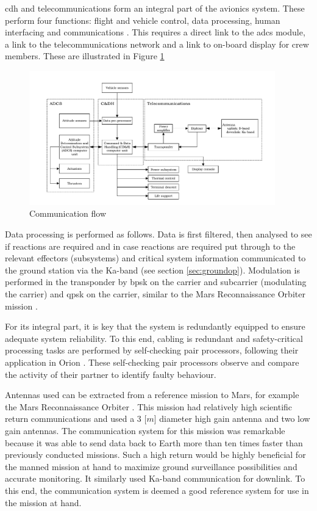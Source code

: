 \acrfull{cdh} and telecommunications form an integral part of the avionics system. These perform four functions: flight and vehicle control, data processing, human interfacing and communications \cite{Eger2008}. This requires a direct link to the \gls{adcs} module, a link to the telecommunications network and a link to on-board display for crew members. These are illustrated in Figure \ref{fig:cdhflow}

\begin{figure}[ht]
		\centering
		\includegraphics[width=0.95\textwidth]{./Figure/CrewModule/CDH.pdf}
		\caption{Communication flow}
		\label{fig:cdhflow}
\end{figure}

Data processing is performed as follows. Data is first filtered, then analysed to see if reactions are required and in case reactions are required put through to the relevant effectors (subsystems) and critical system information communicated to the ground station via the Ka-band (see section \ref{sec:groundop}). Modulation is performed in the transponder by \gls{bpsk} on the carrier and subcarrier (modulating the carrier) and \gls{qpsk} on the carrier, similar to the Mars Reconnaissance Orbiter mission \cite{Taylor2006}.

For its integral part, it is key that the system is redundantly equipped to ensure adequate system reliability. To this end, cabling is redundant and safety-critical processing tasks are performed by self-checking pair processors, following their application in Orion \cite{Eger2008}. These self-checking pair processors observe and compare the activity of their partner to identify faulty behaviour. 

Antennas used can be extracted from a reference mission to Mars, for example the Mars Reconnaissance Orbiter \cite{Taylor2006}. This mission had relatively high scientific return communications and used a $3$ [$m$] diameter high gain antenna and two low gain antennas. The communication system for this mission was remarkable because it was able to send data back to Earth more than ten times faster than previously conducted missions. Such a high return would be highly beneficial for the manned mission at hand to maximize ground surveillance possibilities and accurate monitoring. It similarly used Ka-band communication for downlink. To this end, the communication system is deemed a good reference system for use in the mission at hand.

